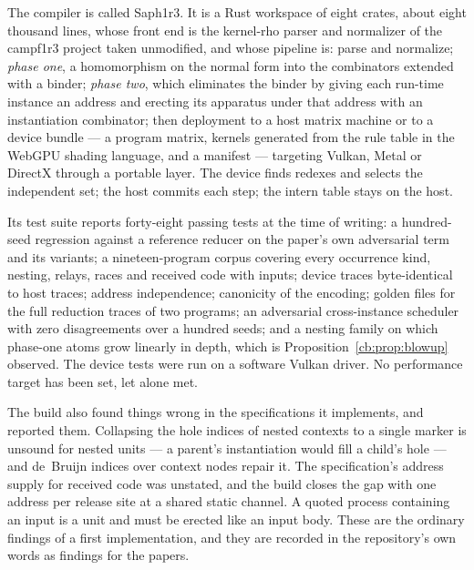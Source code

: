 The compiler is called Saph1r3. It is a Rust workspace of eight crates, about eight thousand
lines, whose front end is the kernel-rho parser and normalizer of the campf1r3 project
taken unmodified, and whose pipeline is: parse and normalize; \emph{phase one}, a
homomorphism on the normal form into the combinators extended with a binder; \emph{phase
two}, which eliminates the binder by giving each run-time instance an address and erecting
its apparatus under that address with an instantiation combinator; then deployment to a
host matrix machine or to a device bundle --- a program matrix, kernels generated from the
rule table in the WebGPU shading language, and a manifest --- targeting Vulkan, Metal or
DirectX through a portable layer. The device finds redexes and selects the independent set;
the host commits each step; the intern table stays on the host.

Its test suite reports forty-eight passing tests at the time of writing: a hundred-seed
regression against a reference reducer on the paper's own adversarial term and its
variants; a nineteen-program corpus covering every occurrence kind, nesting, relays,
races and received code with inputs; device traces byte-identical to host traces; address
independence; canonicity of the encoding; golden files for the full reduction traces of
two programs; an adversarial cross-instance scheduler with zero disagreements over a hundred
seeds; and a nesting family on which phase-one atoms grow linearly in depth, which is
Proposition~\ref{cb:prop:blowup} observed. The device tests were run on a software Vulkan
driver. No performance target has been set, let alone met.

The build also found things wrong in the specifications it implements, and reported them.
Collapsing the hole indices of nested contexts to a single marker is unsound for nested
units --- a parent's instantiation would fill a child's hole --- and de~Bruijn indices over
context nodes repair it. The specification's address supply for received code was
unstated, and the build closes the gap with one address per release site at a shared
static channel. A quoted process containing an input is a unit and must be erected like an
input body. These are the ordinary findings of a first implementation, and they are
recorded in the repository's own words as findings for the papers.


